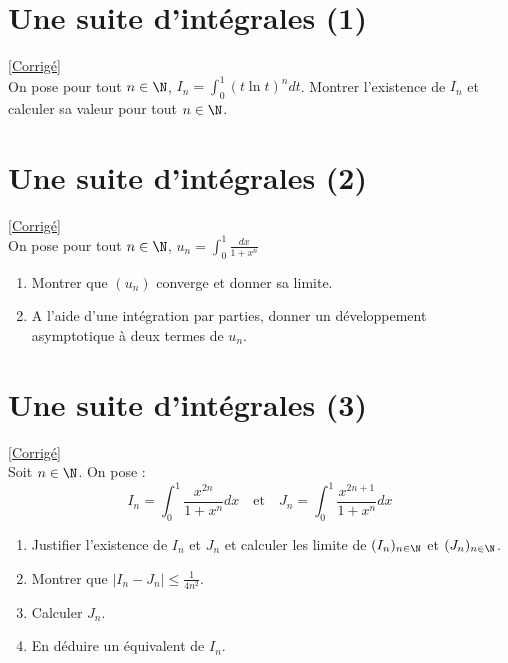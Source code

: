 \documentclass{book}
\begin{document}
	\section{Une suite d'intégrales (1)}
	\textcolor{blue}{\hyperref[sec:une-suite-dintegrales-1]{[Corrigé]}}\\
	\label{suiteintégrale1}
	\label{Une suite d'intégrales 1}
	On pose pour tout $n\in \N$, $I_n=\displaystyle\int_0^1(t\ln t)^ndt$. Montrer l'existence de $I_n$ et calculer sa valeur pour tout $n\in \N$.
	
	\section{Une suite d'intégrales (2)}
	\textcolor{blue}{\hyperref[sec:une-suite-dintegrales-2]{[Corrigé]}}\\
	\label{suiteintégrale2}
	\label{Une suite d'intégrales 2}
	On pose pour tout $n\in\N$, $\displaystyle u_n=\int_0^1\frac{dx}{1+x^n}$
	\begin{enumerate}
		\item Montrer que $(u_n)$ converge et donner sa limite.
		\item A l'aide d'une intégration par parties, donner un développement asymptotique à deux termes de $u_n$.
	\end{enumerate}
	
	\section{Une suite d'intégrales (3)}
	\textcolor{blue}{\hyperref[sec:une-suite-dintegrales-3]{[Corrigé]}}\\
	\label{suiteintégrale3}
	\label{Une suite d'intégrles 3}
	Soit $n\in \N$. On pose :
	$$I_n=\int_0^1\frac{x^{2n}}{1+x^n}dx\quad\text{et}\quad J_n=\int_0^1\frac{x^{2n+1}}{1+x^n}dx$$
	\begin{enumerate}
		\item Justifier l'existence de $I_n$ et $J_n$ et calculer les limite de $(I_n)_{n\in \N}$ et $(J_n)_{n\in \N}$.
		\item Montrer que $|I_n-J_n|\leq \displaystyle\frac{1}{4n^2}$.
		\item Calculer $J_n$.
		\item En déduire un équivalent de $I_n$.
	\end{enumerate}
	
	
\end{document}
